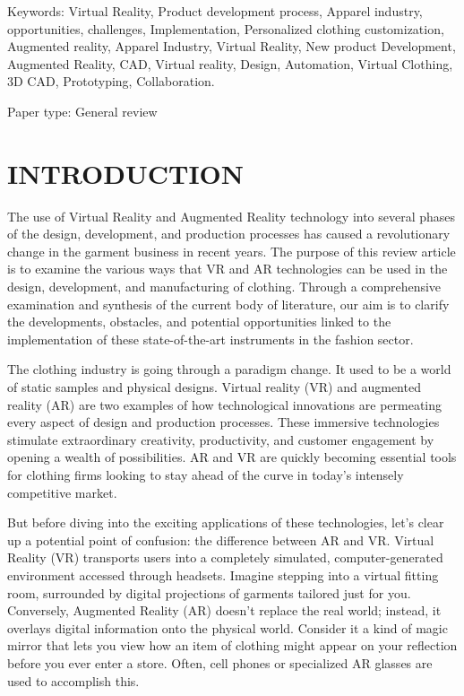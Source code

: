 \documentclass[10pt]{article}
\begin{document}
Keywords: Virtual Reality, Product development process, Apparel industry, opportunities, challenges, Implementation, Personalized clothing customization, Augmented reality, Apparel Industry, Virtual Reality, New product Development, Augmented Reality, CAD, Virtual reality, Design, Automation, Virtual Clothing, 3D CAD, Prototyping, Collaboration.

Paper type: General review

\section*{INTRODUCTION}
The use of Virtual Reality and Augmented Reality technology into several phases of the design, development, and production processes has caused a revolutionary change in the garment business in recent years. The purpose of this review article is to examine the various ways that VR and AR technologies can be used in the design, development, and manufacturing of clothing. Through a comprehensive examination and synthesis of the current body of literature, our aim is to clarify the developments, obstacles, and potential opportunities linked to the implementation of these state-of-the-art instruments in the fashion sector.

The clothing industry is going through a paradigm change. It used to be a world of static samples and physical designs. Virtual reality (VR) and augmented reality (AR) are two examples of how technological innovations are permeating every aspect of design and production processes. These immersive technologies stimulate extraordinary creativity, productivity, and customer engagement by opening a wealth of possibilities. AR and VR are quickly becoming essential tools for clothing firms looking to stay ahead of the curve in today's intensely competitive market.

But before diving into the exciting applications of these technologies, let's clear up a potential point of confusion: the difference between AR and VR. Virtual Reality (VR) transports users into a completely simulated, computer-generated environment accessed through headsets. Imagine stepping into a virtual fitting room, surrounded by digital projections of garments tailored just for you. Conversely, Augmented Reality (AR) doesn't replace the real world; instead, it overlays digital information onto the physical world. Consider it a kind of magic mirror that lets you view how an item of clothing might appear on your reflection before you ever enter a store. Often, cell phones or specialized AR glasses are used to accomplish this.
\end{document}
